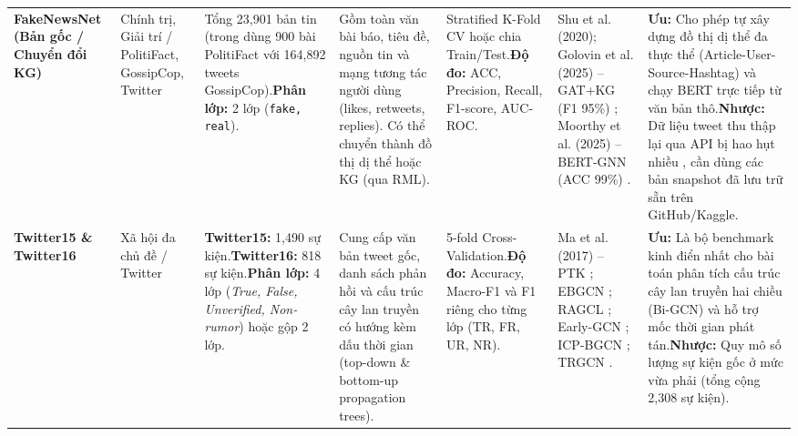 \documentclass[11pt,a4paper]{extreport}
\begin{document}
\begin{landscape}
\begin{longtable}{@{}p{2.8cm}p{2.2cm}p{2.8cm}p{3.8cm}p{3.2cm}p{3.6cm}p{4.2cm}@{}}
\textbf{FakeNewsNet (Bản gốc / Chuyển đổi KG)} \cite{noauthor_disinformation_2024, noauthor_dual_2025, noauthor_improving_2025} & Chính trị, Giải trí / PolitiFact, GossipCop, Twitter & Tổng 23,901 bản tin (trong \cite{noauthor_dual_2025} dùng 900 bài PolitiFact với 164,892 tweets GossipCop).\newline \textbf{Phân lớp:} 2 lớp (\texttt{fake, real}). & Gồm toàn văn bài báo, tiêu đề, nguồn tin và mạng tương tác người dùng (likes, retweets, replies). Có thể chuyển thành đồ thị dị thể hoặc KG (qua RML). & Stratified K-Fold CV hoặc chia Train/Test.\newline \textbf{Độ đo:} ACC, Precision, Recall, F1-score, AUC-ROC. & Shu et al. (2020); Golovin et al. (2025) -- GAT+KG (F1 95\%) \cite{noauthor_improving_2025}; Moorthy et al. (2025) -- BERT-GNN (ACC 99\%) \cite{noauthor_dual_2025}. & \textbf{Ưu:} Cho phép tự xây dựng đồ thị dị thể đa thực thể (Article-User-Source-Hashtag) và chạy BERT trực tiếp từ văn bản thô.\newline \textbf{Nhược:} Dữ liệu tweet thu thập lại qua API bị hao hụt nhiều \cite{noauthor_exploiting_2024}, cần dùng các bản snapshot đã lưu trữ sẵn trên GitHub/Kaggle. \\ 

\textbf{Twitter15 \& Twitter16} \cite{noauthor_disinformation_2024, noauthor_early_2025, noauthor_integrating_2025, ma_detect_2017} & Xã hội đa chủ đề / Twitter & \textbf{Twitter15:} 1,490 sự kiện.\newline \textbf{Twitter16:} 818 sự kiện.\newline \textbf{Phân lớp:} 4 lớp (\textit{True, False, Unverified, Non-rumor}) hoặc gộp 2 lớp. & Cung cấp văn bản tweet gốc, danh sách phản hồi và cấu trúc cây lan truyền có hướng kèm dấu thời gian (top-down \& bottom-up propagation trees). & 5-fold Cross-Validation.\newline \textbf{Độ đo:} Accuracy, Macro-F1 và F1 riêng cho từng lớp (TR, FR, UR, NR). & Ma et al. (2017) -- PTK \cite{ma_detect_2017}; EBGCN \cite{wei_towards_2021}; RAGCL \cite{cui_propagation_2024}; Early-GCN \cite{noauthor_early_2025}; ICP-BGCN \cite{noauthor_integrating_2025}; TRGCN \cite{yan_trgcn_2026}. & \textbf{Ưu:} Là bộ benchmark kinh điển nhất cho bài toán phân tích cấu trúc cây lan truyền hai chiều (Bi-GCN) và hỗ trợ mốc thời gian phát tán.\newline \textbf{Nhược:} Quy mô số lượng sự kiện gốc ở mức vừa phải (tổng cộng 2,308 sự kiện). \\ 


\end{longtable}
\end{landscape}
\end{document}
